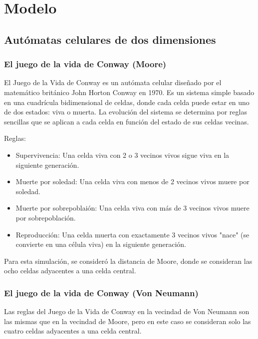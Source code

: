 \section{Modelo}
\label{sec:modelo}

\subsection{Autómatas celulares de dos dimensiones}

\subsubsection{El juego de la vida de Conway (Moore)}

El Juego de la Vida de Conway es un autómata celular diseñado por el matemático británico John Horton Conway en 1970.
Es un sistema simple basado en una cuadrícula bidimensional de celdas, donde cada celda puede estar en uno de dos estados: viva o muerta.
La evolución del sistema se determina por reglas sencillas que se aplican a cada celda en función del estado de sus celdas vecinas.

Reglas:
\begin{itemize}
    \item Supervivencia: Una celda viva con 2 o 3 vecinos vivos sigue viva en la siguiente generación.

    \item Muerte por soledad: Una celda viva con menos de 2 vecinos vivos muere por soledad.

    \item Muerte por sobrepoblaión: Una celda viva con más de 3 vecinos vivos muere por sobrepoblación.

    \item Reproducción: Una celda muerta con exactamente 3 vecinos vivos "nace" (se convierte en una célula viva) en la siguiente generación.
\end{itemize}

Para esta simulación, se consideró la distancia de Moore, donde se consideran las ocho celdas adyacentes a una celda central.

\subsubsection{El juego de la vida de Conway (Von Neumann)}

Las reglas del Juego de la Vida de Conway en la vecindad de Von Neumann son las mismas que en la vecindad de Moore, pero en este caso se consideran solo las cuatro celdas adyacentes a una celda central.

